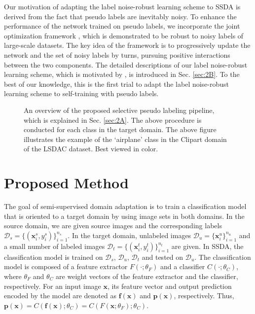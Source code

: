\documentclass[a4paper,conference]{IEEEtran}
\begin{document}
Our motivation of adapting the label noise-robust learning scheme to SSDA is derived from the fact that pseudo labels are inevitably noisy. To enhance the performance of the network trained on pseudo labels, we incorporate the joint optimization framework \cite{tanaka2018joint}, which is demonstrated to be robust to noisy labels of large-scale datasets. The key idea of the framework is to progressively update the network and the set of noisy labels by turns, pursuing positive interactions between the two components. The detailed descriptions of our label noise-robust learning scheme, which is motivated by \cite{tanaka2018joint}, is introduced in Sec. \ref{sec:2B}. To the best of our knowledge, this is the first trial to adapt the label noise-robust learning scheme to self-training with pseudo labels.






\begin{figure*}[t!]
\begin{center}
\begin{minipage}{1.0\linewidth}
\end{minipage}
\end{center}
\caption{An overview of the proposed selective pseudo labeling pipeline, which is explained in Sec. \ref{sec:2A}. The above procedure is conducted for each class in the target domain. The above figure illustrates the example of the `airplane' class in the Clipart domain of the LSDAC dataset\cite{peng2019moment}. Best viewed in color.}
\label{fig:proposed2}
\end{figure*}






\section{Proposed Method}
\label{sec:proposed}
The goal of semi-supervised domain adaptation is to train a classification model that is oriented to a target domain by using image sets in both domains. In the source domain, we are given source images and the corresponding labels $\mathcal{D}_{s}=\{(\mathbf{x}_{i}^{s}, {y}_{i}^{s})\}_{i=1}^{n_{s}}$. In the target domain, unlabeled images $\mathcal{D}_{u}=\{\mathbf{x}_{i}^{u}\}_{i=1}^{n_{u}}$ and a small number of labeled images $\mathcal{D}_{t}=\{(\mathbf{x}_{i}^{t}, {y}_{i}^{t})\}_{i=1}^{n_{t}}$ are given. In SSDA, the classification model is trained on $\mathcal{D}_{s}$, $\mathcal{D}_{u}$, $\mathcal{D}_{t}$ and tested on $\mathcal{D}_{u}$. The classification model is composed of a feature extractor $F(\cdot; \theta_{F})$ and a classifier $C(\cdot ; \theta_{C})$, where $\theta_{F}$ and $\theta_{C}$ are weight vectors of the feature extractor and the classifier, respectively. For an input image $\mathbf{x}$, its feature vector and output prediction encoded by the model are denoted as $\mathbf{f(x)}$ and $\mathbf{p(x)}$, respectively. Thus, $\mathbf{p(x)}=C(\mathbf{f(x)}; \theta_{C})=C(F(\mathbf{x}; \theta_{F}); \theta_{C})$.
\end{document}
